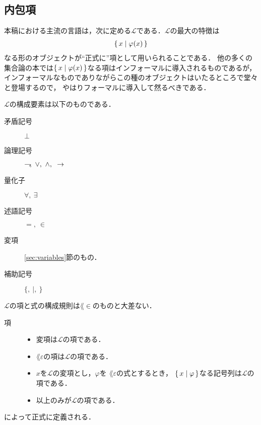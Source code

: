 \subsection{内包項}
	本稿における主流の言語は，次に定める$\mathcal{L}$である．$\mathcal{L}$の最大の特徴は
	\begin{align}
		\{\, x \mid \varphi(x)\, \}
	\end{align}
	なる形のオブジェクトが``正式に''項として用いられることである．
	他の多くの集合論の本では$\{\, x \mid \varphi(x)\, \}$なる項はインフォーマルに導入されるものであるが，
	インフォーマルなものでありながらこの種のオブジェクトはいたるところで堂々と登場するので，
	やはりフォーマルに導入して然るべきである．
	
	$\mathcal{L}$の構成要素は以下のものである．
	
	\begin{description}
		\item[矛盾記号] $\bot$
		\item[論理記号] $\negation,\ \vee,\ \wedge,\ \rarrow$
		\item[量化子] $\forall,\ \exists$
		\item[述語記号] $=,\ \in$
		\item[変項] \ref{sec:variables}節のもの．
		\item[補助記号] $\{,\ |,\ \}$
	\end{description}
	
	$\mathcal{L}$の項と式の構成規則は$\lang{\in}$のものと大差ない．
	
	\begin{description}
		\item[項] 
			\begin{itemize}
				\item 変項は$\mathcal{L}$の項である．
				\item $\lang{\varepsilon}$の項は$\mathcal{L}$の項である．
				\item $x$を$\mathcal{L}$の変項とし，$\varphi$を
					$\lang{\varepsilon}$の式とするとき，
					$\{\, x \mid \varphi\, \}$なる記号列は$\mathcal{L}$の項である．
				\item 以上のみが$\mathcal{L}$の項である．
			\end{itemize}
	\end{description}
	
	によって正式に定義される．
	
